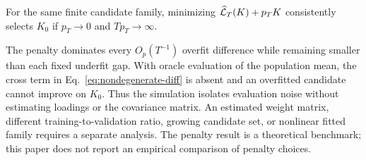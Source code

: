 \begin{corollary}
\label{cor:penalty}
For the same finite candidate family, minimizing $\widehat{\mathcal{L}}_T(K)+p_TK$ consistently selects $K_0$ if $p_T\to0$ and $Tp_T\to\infty$.
\end{corollary}

The penalty dominates every $O_p(T^{-1})$ overfit difference while remaining smaller than each fixed underfit gap. With oracle evaluation of the population mean, the cross term in Eq.~\eqref{eq:nondegenerate-diff} is absent and an overfitted candidate cannot improve on $K_0$. Thus the simulation isolates evaluation noise without estimating loadings or the covariance matrix. An estimated weight matrix, different training-to-validation ratio, growing candidate set, or nonlinear fitted family requires a separate analysis. The penalty result is a theoretical benchmark; this paper does not report an empirical comparison of penalty choices.

